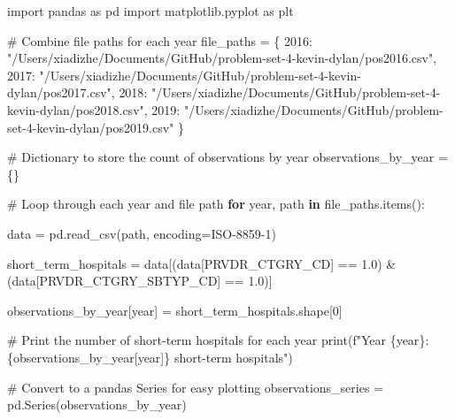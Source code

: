\documentclass[
  letterpaper,
  DIV=11,
  numbers=noendperiod]{scrartcl}
\newenvironment{Shaded}{\begin{snugshade}}{\end{snugshade}}
\newcommand{\BuiltInTok}[1]{\textcolor[rgb]{0.00,0.23,0.31}{#1}}
\newcommand{\CommentTok}[1]{\textcolor[rgb]{0.37,0.37,0.37}{#1}}
\newcommand{\ControlFlowTok}[1]{\textcolor[rgb]{0.00,0.23,0.31}{\textbf{#1}}}
\newcommand{\DecValTok}[1]{\textcolor[rgb]{0.68,0.00,0.00}{#1}}
\newcommand{\FloatTok}[1]{\textcolor[rgb]{0.68,0.00,0.00}{#1}}
\newcommand{\ImportTok}[1]{\textcolor[rgb]{0.00,0.46,0.62}{#1}}
\newcommand{\KeywordTok}[1]{\textcolor[rgb]{0.00,0.23,0.31}{\textbf{#1}}}
\newcommand{\NormalTok}[1]{\textcolor[rgb]{0.00,0.23,0.31}{#1}}
\newcommand{\OperatorTok}[1]{\textcolor[rgb]{0.37,0.37,0.37}{#1}}
\newcommand{\SpecialCharTok}[1]{\textcolor[rgb]{0.37,0.37,0.37}{#1}}
\newcommand{\SpecialStringTok}[1]{\textcolor[rgb]{0.13,0.47,0.30}{#1}}
\newcommand{\StringTok}[1]{\textcolor[rgb]{0.13,0.47,0.30}{#1}}
\begin{document}
\begin{Shaded}
\begin{Highlighting}[]
\ImportTok{import}\NormalTok{ pandas }\ImportTok{as}\NormalTok{ pd}
\ImportTok{import}\NormalTok{ matplotlib.pyplot }\ImportTok{as}\NormalTok{ plt}

\CommentTok{\# Combine file paths for each year}
\NormalTok{file\_paths }\OperatorTok{=}\NormalTok{ \{}
    \DecValTok{2016}\NormalTok{: }\StringTok{"/Users/xiadizhe/Documents/GitHub/problem{-}set{-}4{-}kevin{-}dylan/pos2016.csv"}\NormalTok{,}
    \DecValTok{2017}\NormalTok{: }\StringTok{"/Users/xiadizhe/Documents/GitHub/problem{-}set{-}4{-}kevin{-}dylan/pos2017.csv"}\NormalTok{,}
    \DecValTok{2018}\NormalTok{: }\StringTok{"/Users/xiadizhe/Documents/GitHub/problem{-}set{-}4{-}kevin{-}dylan/pos2018.csv"}\NormalTok{,}
    \DecValTok{2019}\NormalTok{: }\StringTok{"/Users/xiadizhe/Documents/GitHub/problem{-}set{-}4{-}kevin{-}dylan/pos2019.csv"}
\NormalTok{\}}

\CommentTok{\# Dictionary to store the count of observations by year}
\NormalTok{observations\_by\_year }\OperatorTok{=}\NormalTok{ \{\}}

\CommentTok{\# Loop through each year and file path}
\ControlFlowTok{for}\NormalTok{ year, path }\KeywordTok{in}\NormalTok{ file\_paths.items():}
    
\NormalTok{    data }\OperatorTok{=}\NormalTok{ pd.read\_csv(path, encoding}\OperatorTok{=}\StringTok{\textquotesingle{}ISO{-}8859{-}1\textquotesingle{}}\NormalTok{)}
    
\NormalTok{    short\_term\_hospitals }\OperatorTok{=}\NormalTok{ data[(data[}\StringTok{\textquotesingle{}PRVDR\_CTGRY\_CD\textquotesingle{}}\NormalTok{] }\OperatorTok{==} \FloatTok{1.0}\NormalTok{) }\OperatorTok{\&}\NormalTok{ (data[}\StringTok{\textquotesingle{}PRVDR\_CTGRY\_SBTYP\_CD\textquotesingle{}}\NormalTok{] }\OperatorTok{==} \FloatTok{1.0}\NormalTok{)]}
    
\NormalTok{    observations\_by\_year[year] }\OperatorTok{=}\NormalTok{ short\_term\_hospitals.shape[}\DecValTok{0}\NormalTok{]}
    
    \CommentTok{\# Print the number of short{-}term hospitals for each year}
    \BuiltInTok{print}\NormalTok{(}\SpecialStringTok{f"Year }\SpecialCharTok{\{}\NormalTok{year}\SpecialCharTok{\}}\SpecialStringTok{: }\SpecialCharTok{\{}\NormalTok{observations\_by\_year[year]}\SpecialCharTok{\}}\SpecialStringTok{ short{-}term hospitals"}\NormalTok{)}

\CommentTok{\# Convert to a pandas Series for easy plotting}
\NormalTok{observations\_series }\OperatorTok{=}\NormalTok{ pd.Series(observations\_by\_year)}


\end{Highlighting}
\end{Shaded}
\end{document}
